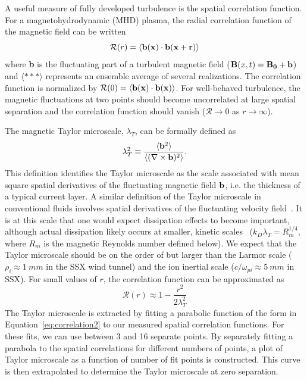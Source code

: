 \documentclass[aip,prl,amsmath,amssymb,reprint,superscriptaddress]{revtex4-1} %
\begin{document}
A useful measure of fully developed turbulence is the spatial correlation function.  For a magnetohydrodynamic (MHD) plasma, the radial correlation function of the magnetic field can be written
%
\begin{equation}
\mathcal{R}(r) =  \langle {\bf b(x) \cdot b(x + r)} \rangle
\label{eq:correlation1}
\end{equation}
%
where {\bf b} is the fluctuating part of a turbulent magnetic field (${\bf B}(x, t) = {\bf B_0 + b}$) and $ \langle*** \rangle$ represents an ensemble average of several realizations.  The correlation function is normalized by $\mathcal{R}(0) =  \langle {\bf b(x) \cdot b(x)} \rangle$.  For well-behaved turbulence, the magnetic fluctuations at two points should become uncorrelated at large spatial separation and the correlation function should vanish ($\mathcal{R} \rightarrow 0$ as $r \rightarrow \infty$).  

The magnetic Taylor microscale, $\lambda_{T}$, can be formally defined as
%
\begin{equation}
\lambda_T^2 \equiv \frac{\langle {\bf b}^2 \rangle}{\langle (\nabla \times {\bf b})^2 \rangle}.
\label{eq:tayscale}
\end{equation}
%
This definition identifies the Taylor microscale as the scale associated with mean square spatial derivatives of the fluctuating magnetic field $\bf{b}$, i.e. the thickness of a typical current layer. A similar definition of the Taylor microscale in conventional fluids involves spatial derivatives of the fluctuating velocity field~\cite{frisch95}. It is at this scale that one would expect dissipation effects to become important, although actual dissipation likely occurs at smaller, kinetic scales~\cite{Matthaeus08} ($k_D \lambda_T = R_m^{1/4}$, where $R_m$ is the magnetic Reynolds number defined below).  We expect that the Taylor microscale should be on the order of but larger than the Larmor scale ($\rho_i \approx 1~mm$ in the SSX wind tunnel) and the ion inertial scale ($c/\omega_{pi} \approx 5~mm$ in SSX). For small values of $r$, the correlation function can be approximated as
%
\begin{equation}
\mathcal{R}(r) \approx  1 - \frac{r^2}{2 \lambda_T^2} 
\label{eq:correlation2} 
\end{equation}
%
The Taylor microscale is extracted by fitting a parabolic function of the form in Equation~\ref{eq:correlation2} to our measured spatial correlation functions.  For these fits, we can use between 3 and 16 separate points. By separately fitting a parabola to the spatial correlations for different numbers of points, a plot of Taylor microscale as a function of number of fit points is constructed. This curve is then extrapolated to determine the Taylor microscale at zero separation. 
\end{document}
